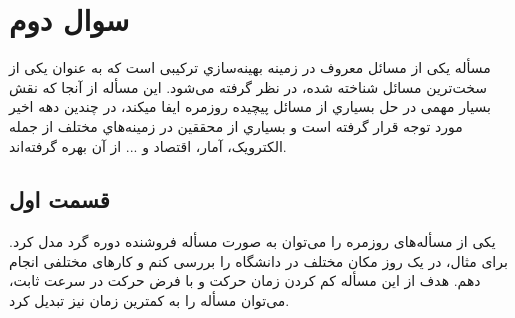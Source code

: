\section{سوال دوم}
مسأله  يکی از مسائل معروف در زمینه بهینه‌سازي ترکیبی است که به عنوان يکی از سخت‌ترين مسائل شناخته شده، در نظر گرفته می‌شود. اين مسأله از آنجا که نقش بسیار مهمی در حل بسیاري از مسائل  پیچیده روزمره ايفا میکند، در چندين دهه اخیر مورد توجه قرار گرفته است و بسیاري از محققین در زمینه‌هاي مختلف از جمله الکترويک، آمار، اقتصاد و ... از آن بهره گرفته‌اند.
\subsection{قسمت اول}
یکی از مسأله‌های روزمره را می‌توان به صورت مسأله فروشنده دوره گرد مدل کرد. برای مثال، در یک روز  مکان مختلف در دانشگاه را بررسی کنم و کارهای مختلفی انجام دهم. هدف از این مسأله کم کردن زمان حرکت و با فرض حرکت در سرعت ثابت، می‌توان مسأله را به کمترین زمان نیز تبدیل کرد.